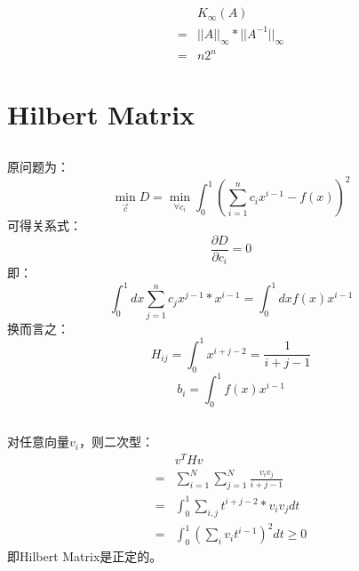 \documentclass{ctexart}
\begin{document}
    \subsection{}
    \begin{align*}
        &K_\infty(A)\\
        =&||A||_\infty*||A^{-1}||_\infty\\
        =&n2^n
    \end{align*}
    \section{Hilbert Matrix}
    \subsection{}
    原问题为：
    $$\min_{\vec{c}}D=\min_{\forall c_i}{\int_0^1(\sum_{i=1}^{n}c_ix^{i-1}-f(x))^2}$$
    可得关系式：
    $$\frac{\partial D}{\partial c_i}=0$$
    即：
    $$\int_0^1dx\sum_{j=1}^{n}c_jx^{j-1}*x^{i-1}=\int_0^1dxf(x)x^{i-1}$$
    换而言之：
    $$H_{ij}=\int_0^1x^{i+j-2}=\frac{1}{i+j-1}$$
    $$b_i=\int_0^1f(x)x^{i-1}$$
    \subsection{}
    对任意向量$v_i$，则二次型：
    \begin{align*}
        &v^THv\\
        =&\sum_{i=1}^{N}\sum_{j=1}^{N}{\frac{v_iv_j}{i+j-1}}\\
        =&\int_0^1\sum_{i,j}t^{i+j-2}*v_iv_jdt\\
        =&\int_0^1(\sum_{i}{v_it^{i-1}})^2dt\geq0
    \end{align*}
    即Hilbert Matrix是正定的。
\end{document}
